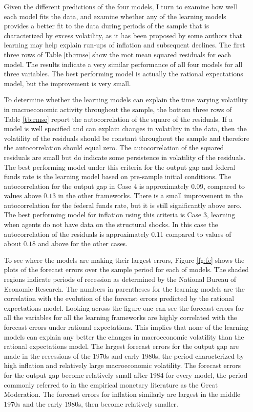Given the different predictions of the four models, I turn to examine how well each model fits the data, and examine whether any of the learning models provides a better fit to the data during periods of the sample that is characterized by excess volatility, as it has been proposed by some authors that learning may help explain run-ups of inflation and subsequent declines.  The first three rows of Table \ref{tb:rmse} show the root mean squared residuals for each model.  The results indicate a very similar performance of all four models for all three variables.  The best performing model is actually the rational expectations model, but the improvement is very small.  

To determine whether the learning models can explain the time varying volatility in macroeconomic activity throughout the sample, the bottom three rows of Table \ref{tb:rmse} report the autocorrelation of the square of the residuals.  If a model is well specified and can explain changes in volatility in the data, then the volatility of the residuals should be constant throughout the sample and therefore the autocorrelation should equal zero.  The autocorrelation of the squared residuals are small but do indicate some persistence in volatility of the residuals.  The best performing model under this criteria for the output gap and federal funds rate is the learning model based on pre-sample initial conditions.  The autocorrelation for the output gap in Case 4 is approximately $0.09$, compared to values above $0.13$ in the other frameworks.  There is a small improvement in the autocorrelation for the federal funds rate, but it is still significantly above zero.  The best performing model for inflation using this criteria is Case 3, learning when agents do not have data on the structural shocks.  In this case the autocorrelation of the residuals is approximately $0.11$ compared to values of about $0.18$ and above for the other cases.

To see where the models are making their largest errors, Figure \ref{fg:fe} shows the plots of the forecast errors over the sample period for each of models.  The shaded regions indicate periods of recession as determined by the National Bureau of Economic Research.  The numbers in parentheses for the learning models are the correlation with the evolution of the forecast errors predicted by the rational expectations model.  Looking across the figure one can see the forecast errors for all the variables for all the learning frameworks are highly correlated with the forecast errors under rational expectations.  This implies that none of the learning models can explain any better the changes in macroeconomic volatility than the rational expectations model.  The largest forecast errors for the output gap are made in the recessions of the 1970s and early 1980s, the period characterized by high inflation and relatively large macroeconomic volatility.  The forecast errors for the output gap become relatively small after 1984 for every model, the period commonly referred to in the empirical monetary literature as the Great Moderation.  The forecast errors for inflation similarly are largest in the middle 1970s and the early 1980s, then become relatively smaller.

